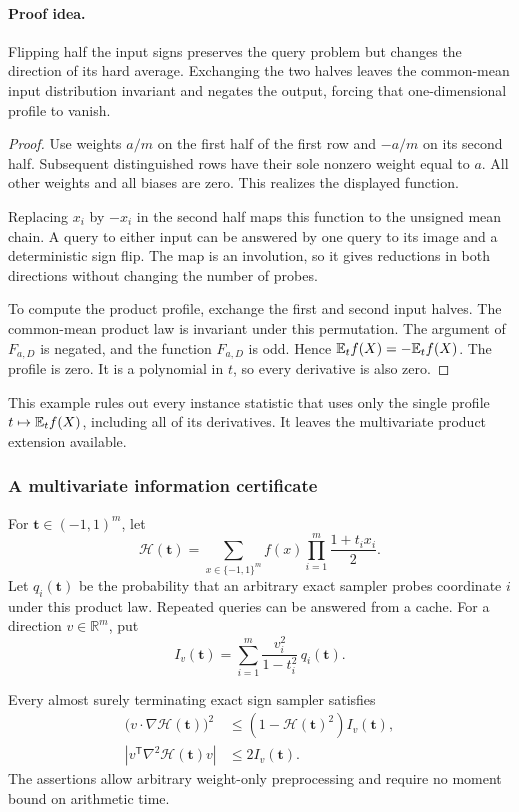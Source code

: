 \paragraph{Proof idea.}
Flipping half the input signs preserves the query problem but
changes the direction of its hard average. Exchanging the two halves leaves
the common-mean input distribution invariant and negates the output, forcing
that one-dimensional profile to vanish.

\begin{proof}
Use weights \(a/m\) on the first half of the first row and
\(-a/m\) on its second half.  Subsequent distinguished rows
have their sole nonzero weight equal to \(a\).  All other weights
and all biases are zero.  This realizes the displayed function.

Replacing \(x_i\) by \(-x_i\) in the second half maps this
function to the unsigned mean chain.  A query to either input can
be answered by one query to its image and a deterministic sign flip.
The map is an involution, so it gives reductions in both directions
without changing the number of probes.

To compute the product profile, exchange the first and second input
halves.  The common-mean product law is invariant under this
permutation.  The argument of \(F_{a,D}\) is negated, and the
function \(F_{a,D}\) is odd.  Hence \(\mathbb E_t f(X)=-\mathbb E_t f(X)\).
The profile is zero.  It is a polynomial in \(t\), so every
derivative is also zero.
\end{proof}

This example rules out every instance statistic that uses only the
single profile \(t\mapsto\mathbb E_t f(X)\), including all of its
derivatives.  It leaves the multivariate product extension available.

\subsubsection{A multivariate information certificate}

For \(\boldsymbol t\in(-1,1)^m\), let
\[
 \mathcal H(\boldsymbol t)=
 \sum_{x\in\{-1,1\}^m} f(x)
 \prod_{i=1}^m\frac{1+t_ix_i}{2}.
\]
Let \(q_i(\boldsymbol t)\) be the probability that an arbitrary
exact sampler probes coordinate \(i\) under this product law.
Repeated queries can be answered from a cache.  For a direction
\(v\in\mathbb R^m\), put
\[
 I_v(\boldsymbol t)=\sum_{i=1}^m
 \frac{v_i^2}{1-t_i^2}\,q_i(\boldsymbol t).
\]

\begin{lemma}
\label{lem:multivariate-transcript}
Every almost surely terminating exact sign sampler satisfies
\begin{align}
 \bigl(v\cdot\nabla\mathcal H(\boldsymbol t)\bigr)^2
 &\le (1-\mathcal H(\boldsymbol t)^2)I_v(\boldsymbol t),
 \label{eq:multivariate-information}\\
 \left|v^{\mathsf T}\nabla^2\mathcal H(\boldsymbol t)v\right|
 &\le2I_v(\boldsymbol t).
 \label{eq:multivariate-curvature}
\end{align}
The assertions allow arbitrary weight-only preprocessing and require
no moment bound on arithmetic time.
\end{lemma}


